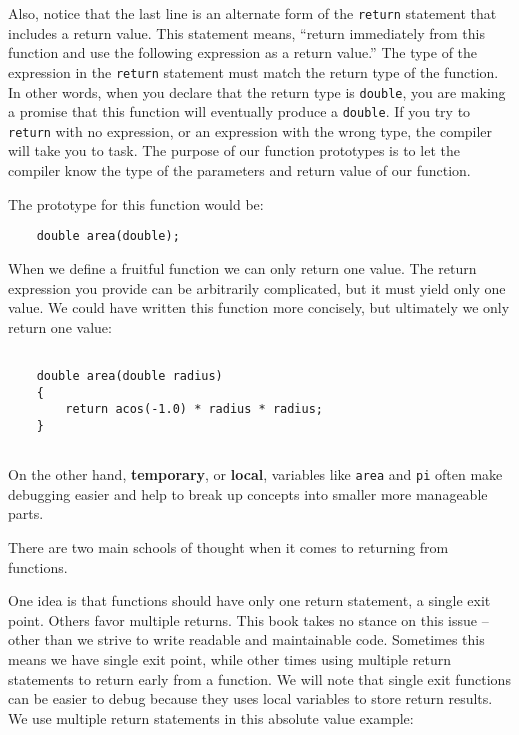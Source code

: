 Also, notice that the last line is an alternate form of the
{\tt return} statement that includes a return value.  This
statement means, ``return immediately from this function and
use the following expression as a return value.'' The type of the expression in
the {\tt return} statement must match the return type of the function.
In other words, when you declare that the return type is {\tt double},
you are making a promise that this function will eventually
produce a {\tt double}.  If you try to {\tt return} with no
expression, or an expression with the wrong type, the compiler will
take you to task. The purpose of our function prototypes is to
let the compiler know the type of the parameters and return value of our function.
 
The prototype for this function would be:

\begin{verbatim}
	double area(double);
\end{verbatim}
%

When we define a fruitful function we can only return one value. The return
expression you provide can be arbitrarily complicated, but it must yield only one value. 
We could have written this function more concisely, but ultimately we only return one value:

\begin{verbatim}

    double area(double radius) 
    {
    	return acos(-1.0) * radius * radius;
    }
    
\end{verbatim}
%

On the other hand, {\bf temporary}, or {\bf local}, variables like {\tt area} and {\tt pi} often
make debugging easier and help to break up concepts into smaller more manageable parts.

There are two main schools of thought when it comes to returning from functions.

One idea is that functions should have only one return statement, a single exit point. 
Others favor multiple returns. This book takes no stance on this issue -- other than we 
strive to write readable and maintainable code. Sometimes this means we have single exit point, 
while other times using multiple return statements to return early from a function.
We will note that single exit functions can be easier to debug because they
uses local variables to store return results.
We use multiple return statements in this absolute value example:


